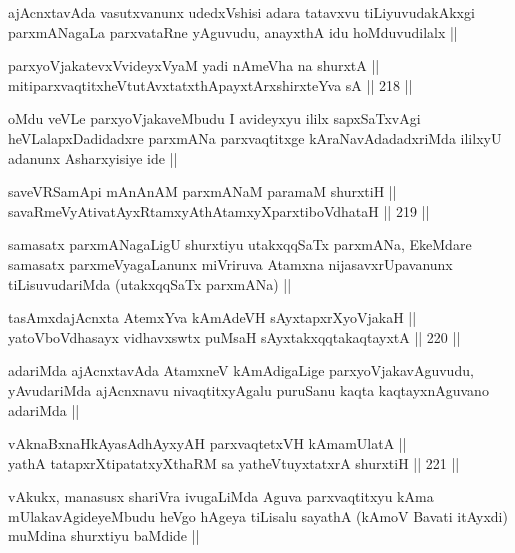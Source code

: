 \begin{artha}
ajAcnxtavAda vasutxvanunx udedxVshisi adara tatavxvu tiLiyuvudakAkxgi
parxmANagaLa parxvataRne yAguvudu, anayxthA idu hoMduvudilalx ||
\end{artha}

\begin{shl}
parxyoVjakatevxV\s videyxVyaM yadi nAmeVha na shurxtA || \\
mitiparxvaqtitxheVtutAvxtatxthA\s payxtArx\s \s shirxteYva sA ||  218 ||  
\end{shl}

\begin{artha}
oMdu veVLe parxyoVjakaveMbudu I avideyxyu ililx sapxSaTxvAgi
heVLalapxDadidadxre parxmANa parxvaqtitxge kAraNavAdadadxriMda ililxyU
adanunx Asharxyisiye ide ||
\end{artha}

\begin{shl}
saveVRSamApi mAnAnAM parxmANaM paramaM shurxtiH || \\
savaRmeVyAtivatAyxRtamxyAthAtamxyXparxtiboVdhataH ||  219 ||  
\end{shl}

\begin{artha}
samasatx parxmANagaLigU shurxtiyu utakxqqSaTx parxmANa, EkeMdare
samasatx parxmeVyagaLanunx miVriruva Atamxna nijasavxrUpavanunx
tiLisuvudariMda (utakxqqSaTx parxmANa) ||
\end{artha}

\begin{shl}
tasAmxdajAcnxta AtemxYva kAmAdeVH sAyxtapxrXyoVjakaH || \\
yatoV\s boVdhasayx vidhavxswtx puMsaH sAyxtakxqqtakaqtayxtA ||  220 ||  
\end{shl}

\begin{artha}
adariMda ajAcnxtavAda AtamxneV kAmAdigaLige parxyoVjakavAguvudu,
yAvudariMda ajAcnxnavu nivaqtitxyAgalu puruSanu kaqta kaqtayxnAguvano
adariMda ||
\end{artha}


\begin{shl}
vAknaBxnaHkAyasAdhAyxyAH parxvaqtetxVH kAmamUlatA || \\
yathA tatapxrXtipatatxyXthaRM sa yatheVtuyxtatxrA shurxtiH ||  221 ||  
\end{shl}

\begin{artha}
vAkukx, manasusx shariVra ivugaLiMda Aguva parxvaqtitxyu kAma
mUlakavAgideyeMbudu heVgo hAgeya tiLisalu sayathA (kAmoV Bavati
itAyxdi) muMdina shurxtiyu baMdide || 
\end{artha}

